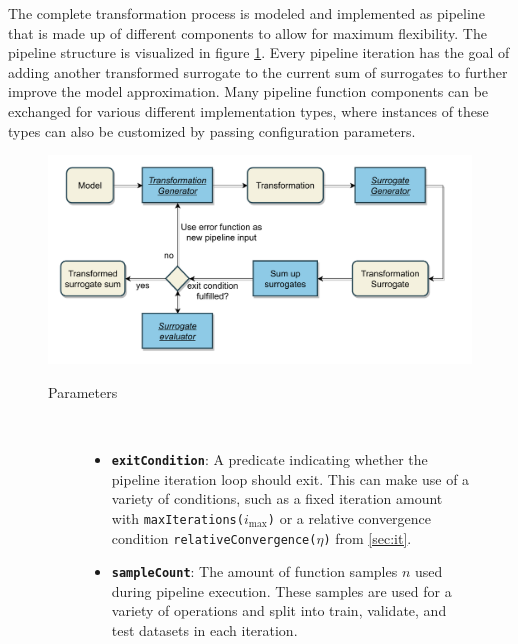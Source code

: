 \documentclass[
  a4paper,  %
  twoside,  %
  bibliography=totoc,
  headsepline,
  cleardoublepage=empty,
  parskip=half,
  draft=false
]{scrbook}
\begin{document}
The complete transformation process is modeled and implemented as pipeline that is made up of different components to allow for maximum flexibility.
The pipeline structure is visualized in figure \cref{fig:tp}.
Every pipeline iteration has the goal of adding another transformed surrogate to the current sum of surrogates to further improve the model approximation.
Many pipeline function components can be exchanged for various different implementation types, where instances of these types can also be customized by passing configuration parameters.

\begin{mdframed}[style=style,frametitle={Transformation Pipeline}]
\begin{figure}[H]

\includegraphics[width=\textwidth]{graphics/TransformationPipeline.pdf}
\vspace{-7.5mm}

\delimit

\begin{description}
\item[Parameters] {~ \begin{itemize}[\indent{}]
\item \texttt{\textbf{exitCondition}}: A predicate indicating whether the pipeline iteration loop should exit. This can make use of a variety of conditions, such as a fixed iteration amount with \texttt{maxIterations($i_{\mathrm{max}}$)} or a relative convergence condition \texttt{relativeConvergence($\eta$)} from \cref{sec:it}.
\item \texttt{\textbf{sampleCount}}: The amount of function samples $n$ used during pipeline execution. These samples are used for a variety of operations and split into train, validate, and test datasets in each iteration.
\end{itemize}}
\end{description}

\delimit

\label{fig:tp}
\end{figure}
\end{mdframed}
\end{document}
